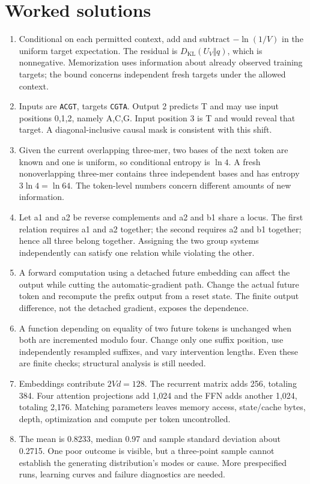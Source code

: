 \section{Worked solutions}
\begin{enumerate}
\item Conditional on each permitted context, add and subtract $-\ln(1/V)$ in the uniform target expectation. The residual is $D_{\mathrm{KL}}(U_V\Vert q)$, which is nonnegative. Memorization uses information about already observed training targets; the bound concerns independent fresh targets under the allowed context.
\item Inputs are \texttt{ACGT}, targets \texttt{CGTA}. Output 2 predicts T and may use input positions 0,1,2, namely A,C,G. Input position 3 is T and would reveal that target. A diagonal-inclusive causal mask is consistent with this shift.
\item Given the current overlapping three-mer, two bases of the next token are known and one is uniform, so conditional entropy is $\ln4$. A fresh nonoverlapping three-mer contains three independent bases and has entropy $3\ln4=\ln64$. The token-level numbers concern different amounts of new information.
\item Let a1 and a2 be reverse complements and a2 and b1 share a locus. The first relation requires a1 and a2 together; the second requires a2 and b1 together; hence all three belong together. Assigning the two group systems independently can satisfy one relation while violating the other.
\item A forward computation using a detached future embedding can affect the output while cutting the automatic-gradient path. Change the actual future token and recompute the prefix output from a reset state. The finite output difference, not the detached gradient, exposes the dependence.
\item A function depending on equality of two future tokens is unchanged when both are incremented modulo four. Change only one suffix position, use independently resampled suffixes, and vary intervention lengths. Even these are finite checks; structural analysis is still needed.
\item Embeddings contribute $2Vd=128$. The recurrent matrix adds 256, totaling 384. Four attention projections add 1,024 and the FFN adds another 1,024, totaling 2,176. Matching parameters leaves memory access, state/cache bytes, depth, optimization and compute per token uncontrolled.
\item The mean is 0.8233, median 0.97 and sample standard deviation about 0.2715. One poor outcome is visible, but a three-point sample cannot establish the generating distribution's modes or cause. More prespecified runs, learning curves and failure diagnostics are needed.

\end{enumerate}
